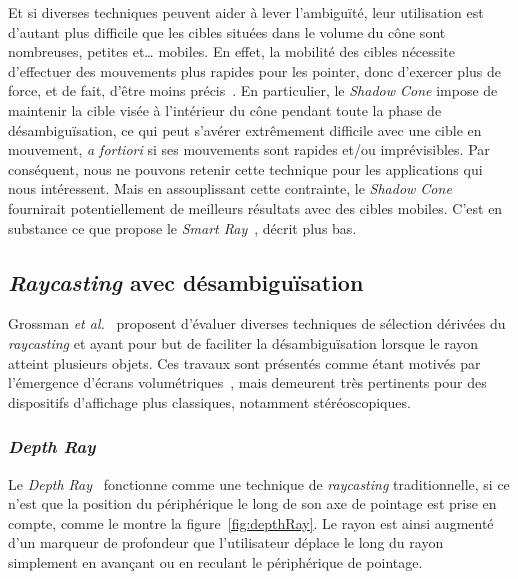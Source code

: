 	Et si diverses techniques peuvent aider à lever l'ambiguïté, leur utilisation est d'autant plus difficile que les cibles situées dans le volume du cône sont nombreuses, petites et\ldots{} mobiles. En effet, la mobilité des cibles nécessite d'effectuer des mouvements plus rapides pour les pointer, donc d'exercer plus de force, et de fait, d'être moins précis~\cite{schmidt1979motor}. En particulier, le \emph{Shadow Cone} impose de maintenir la cible visée à l'intérieur du cône pendant toute la phase de désambiguïsation, ce qui peut s'avérer extrêmement difficile avec une cible en mouvement, \emph{a fortiori} si ses mouvements sont rapides et/ou imprévisibles. Par conséquent, nous ne pouvons retenir cette technique pour les applications qui nous intéressent. Mais en assouplissant cette contrainte, le \emph{Shadow Cone} fournirait potentiellement de meilleurs résultats avec des cibles mobiles. C'est en substance ce que propose le \emph{Smart Ray}~\cite{grossman2006design}, décrit plus bas.

	\subsection{\emph{Raycasting} avec désambiguïsation}
	Grossman \emph{et al.}~\cite{grossman2006design} proposent d'évaluer diverses techniques de sélection dérivées du \emph{raycasting} et ayant pour but de faciliter la désambiguïsation lorsque le rayon atteint plusieurs objets. Ces travaux sont présentés comme étant motivés par l'émergence d'écrans volumétriques\footnotemark{}~\cite{ebert1999realizing}, mais demeurent très pertinents pour des dispositifs d'affichage plus classiques, notamment stéréoscopiques.
	

	\subsubsection{\emph{Depth Ray}}
	Le \emph{Depth Ray}~\cite{grossman2006design} fonctionne comme une technique de \emph{raycasting} traditionnelle, si ce n'est que la position du périphérique le long de son axe de pointage est prise en compte, comme le montre la figure~\ref{fig:depthRay}. Le rayon est ainsi augmenté d'un marqueur de profondeur que l'utilisateur déplace le long du rayon simplement en avançant ou en reculant le périphérique de pointage.
	
